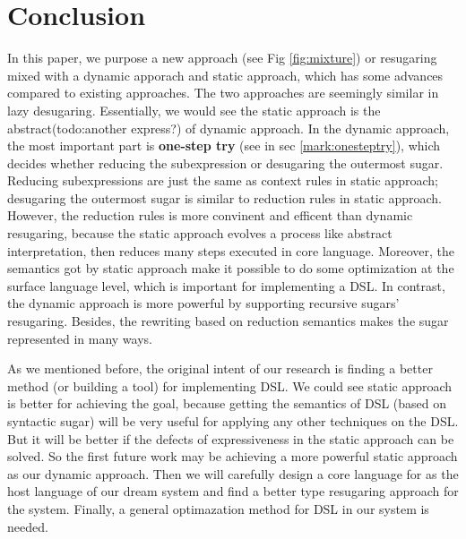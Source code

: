 \section{Conclusion}
\label{sec6}


In this paper, we purpose a new approach (see Fig \ref{fig:mixture}) or resugaring mixed with a dynamic apporach and static approach, which has some advances compared to existing approaches. The two approaches are seemingly similar in lazy desugaring. Essentially, we would see the static approach is the abstract(todo:another express?) of dynamic approach. In the dynamic approach, the most important part is {\bfseries one-step try} (see in sec \ref{mark:onesteptry}), which decides whether reducing the subexpression or desugaring the outermost sugar. Reducing subexpressions are just the same as context rules in static approach; desugaring the outermost sugar is similar to reduction rules in static approach. However, the reduction rules is more convinent and efficent than dynamic resugaring, because the static approach evolves a process like abstract interpretation\cite{AbstractInterpretation}, then reduces many steps executed in core language. Moreover, the semantics got by static approach make it possible to do some optimization at the surface language level, which is important for implementing a DSL. In contrast, the dynamic approach is more powerful by supporting recursive sugars' resugaring. Besides, the rewriting based on reduction semantics makes the sugar represented in many ways.

As we mentioned before, the original intent of our research is finding a better method (or building a tool) for implementing DSL. We could see static approach is better for achieving the goal, because getting the semantics of DSL (based on syntactic sugar) will be very useful for applying any other techniques on the DSL. But it will be better if the defects of expressiveness in the static approach can be solved. So the first future work may be achieving a more powerful static approach as our dynamic approach. Then we will carefully design a core language for as the host language of our dream system and find a better type resugaring approach for the system. Finally, a general optimazation method for DSL in our system is needed.